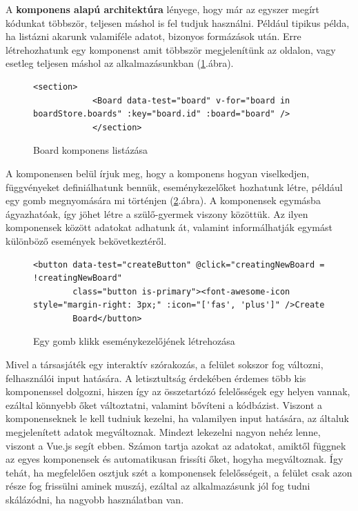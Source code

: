 \documentclass[a4paper,twoside]{article}
\begin{document}
 A \textbf{komponens alapú architektúra} lényege, hogy már az egyszer megírt kódunkat többször, teljesen máshol is fel tudjuk használni. Például tipikus példa, 
ha listázni akarunk valamiféle adatot, bizonyos formázások után. Erre létrehozhatunk egy komponenst amit többször megjelenítünk az oldalon, vagy esetleg teljesen máshol az alkalmazásunkban (\ref{komponens}.ábra).
\begin{figure}
	\caption{Board komponens listázása}
	\begin{minipage}{\textwidth}
		\begin{lstlisting}[style=javascriptStyle]
			<section>
			<Board data-test="board" v-for="board in boardStore.boards" :key="board.id" :board="board" />
			</section>
		\end{lstlisting}
	\end{minipage}
	\label{komponens}
\end{figure}
\FloatBarrier
A komponensen belül írjuk meg, hogy a komponens hogyan viselkedjen, függvényeket definiálhatunk bennük, eseménykezelőket hozhatunk létre, például egy gomb megnyomására mi történjen (\ref{button-click}.ábra). A komponensek egymásba ágyazhatóak, így jöhet létre a szülő-gyermek viszony közöttük. Az ilyen komponensek között adatokat adhatunk át, valamint informálhatják egymást különböző események bekövetkeztéről. 
\begin{figure}
	\caption{Egy gomb klikk eseménykezelőjének létrehozása}
	\begin{minipage}{\textwidth}
		\begin{lstlisting}[style=javascriptStyle]
		<button data-test="createButton" @click="creatingNewBoard = !creatingNewBoard"
		class="button is-primary"><font-awesome-icon style="margin-right: 3px;" :icon="['fas', 'plus']" />Create
		Board</button>
		\end{lstlisting}
	\end{minipage}
	\label{button-click}
\end{figure}

Mivel a társasjáték egy interaktív szórakozás, a felület sokszor fog változni, felhasználói input hatására. A letisztultság érdekében érdemes több kis komponenssel dolgozni, hiszen így az összetartózó felelősségek egy helyen vannak, ezáltal könnyebb őket változtatni, valamint bővíteni a kódbázist. Viszont a komponenseknek le kell tudniuk kezelni, ha valamilyen input hatására, az általuk megjelenített adatok megváltoznak. Mindezt lekezelni nagyon nehéz lenne, viszont a Vue.js segít ebben. Számon tartja azokat az adatokat, amiktől függnek az egyes komponensek és automatikusan frissíti őket, hogyha megváltoznak. Így tehát, ha megfelelően osztjuk szét a komponensek felelősségeit, a felület csak azon része fog frissülni aminek muszáj, ezáltal az alkalmazásunk jól fog tudni skálázódni, ha nagyobb használatban van. 
\end{document}
